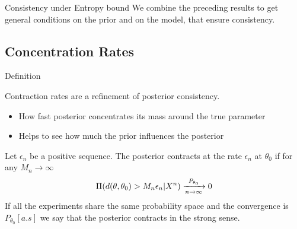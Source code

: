 
\begin{frame}{Consistency under Entropy bound}
We combine the preceding results to get general conditions \alert<2->{on the prior} and \alert<2->{on the model}, that ensure consistency. 
\begin{overprint}
\end{overprint}

\end{frame}



\subsection{Concentration Rates}


\begin{frame}{Definition}

Contraction rates are a refinement of posterior consistency. \pause 
\begin{itemize}[<+-|alert@+>]
\item How fast posterior concentrates its mass around the true parameter
\item Helps to see how much the prior influences the posterior
\end{itemize}
\pause 

\begin{definition}
Let $\epsilon_n$ be a positive sequence. The posterior contracts at the rate $\epsilon_n$ at $\theta_0$ if for any $M_n \to \infty$ 
$$
\Pi(d(\theta,\theta_0)> M_n \epsilon_n|X^n) \xrightarrow[n \to \infty]{P_{\theta_0}} 0 
$$
If all the experiments share the same probability space and the convergence is $P_{\theta_0}[a.s]$ we say that the posterior contracts in the strong sense.
\end{definition}

\end{frame}


